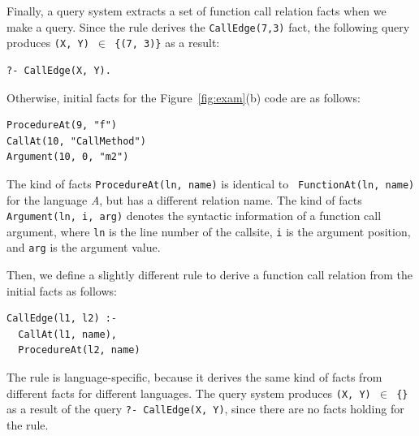 Finally, a query system extracts a set of function call relation facts when we
make a query. Since the rule derives the {\tt CallEdge(7,3)} fact, the
following query produces {\tt (X, Y) $\in$ \{(7, 3)\}} as a result:


\begin{lstlisting}
?- CallEdge(X, Y).
\end{lstlisting}


Otherwise, initial facts for the Figure~\ref{fig:exam}(b) code are as follows: 

\begin{lstlisting}
ProcedureAt(9, "f")
CallAt(10, "CallMethod")
Argument(10, 0, "m2")
\end{lstlisting}

\noindent
The kind of facts {\tt ProcedureAt(ln, name)} is identical to {\tt
FunctionAt(ln, name)} for the language {\it A}, but has a different relation
name. The kind of facts {\tt Argument(ln, i, arg)} denotes the syntactic
information of a function call argument, where {\tt ln} is the line number of
the callsite, {\tt i} is the argument position, and {\tt arg} is the argument
value.

Then, we define a slightly different rule to derive a function call relation
from the initial facts as follows: 

\begin{lstlisting}
CallEdge(l1, l2) :-
  CallAt(l1, name),
  ProcedureAt(l2, name)
\end{lstlisting}

\noindent
The rule is language-specific, because it derives the same kind of facts from
different facts for different languages.  The query system produces {\tt (X, Y)
$\in$ \{\}} as a result of the query {\tt ?- CallEdge(X, Y)}, since there are
no facts holding for the rule.

